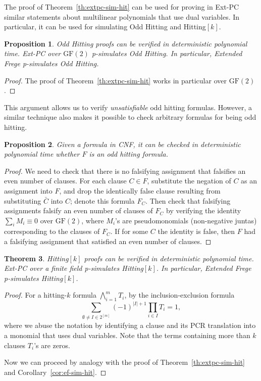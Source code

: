 \documentclass[11pt]{article}
\newcommand{\scterm}[1]{{\textrm{\sc #1}}}
\newcommand{\hit}{\scterm{Hitting}}
\newcommand{\F}{\scterm{Frege}}
\newcommand{\EF}{\scterm{Extended {\F}}}
\newcommand{\extpc}{\scterm{Ext-PC}}
\newcommand{\pcr}{\scterm{PCR}}
\newcommand{\hitodd}{\scterm{Odd} {\hit}}
\newcommand{\hitk}[1]{\hit$[#1]$}
\newcommand{\GF}{\mathrm{GF}}
\numberwithin{equation}{section}
\newtheorem{theorem}{Theorem}[section]
\newtheorem{proposition}[theorem]{Proposition}
\begin{document}
The proof of Theorem~\ref{th:extpc-sim-hit} can be used for
proving in {\extpc} similar statements about multilinear polynomials
that use dual variables. In particular, it can be used for 
simulating {\hitodd} and {\hitk{k}}. 

\begin{proposition}\label{prop:hitodd-verification}
{\hitodd} proofs can be verified in deterministic polynomial time.
{\extpc} over $\GF(2)$ p-simulates {\hitodd}.
In particular, {\EF} p-simulates {\hitodd}.
\end{proposition}
\begin{proof}The proof of Theorem~\ref{th:extpc-sim-hit} works in particular over $\GF(2)$.\end{proof}
This argument allows us to verify \emph{unsatisfiable} odd hitting formulas.
However, a similar technique also makes it possible to check arbitrary formulas
for being odd hitting.
\begin{proposition}\label{prop:hitodd-formula-verification}
Given a formula in CNF, it can be checked in deterministic polynomial time
whether $F$ is an odd hitting formula.
\end{proposition}
\begin{proof}
We need to check that there is no falsifying assignment that falsifies
an even number of clauses. For each clause $C\in F$, substitute
the negation of $C$ as an assignment into $F$, and drop the identically false
clause resulting from substituting $\bar{C}$ into $C$; denote this formula $F_C$. 
Then check that falsifying assignments falsify an even number of clauses of $F_C$
by verifying the identity $\sum_i M_i \equiv 0$ over $\GF(2)$, where $M_i$'s are pseudomonomials (non-negative juntas)
corresponding to the clauses of $F_C$. If for some $C$ the identity is false,
then $F$ had a falsifying assignment that satisfied an even number of clauses.
\end{proof}

\begin{theorem}\label{th:hitk-simulation}
{\hitk{k}} proofs can be verified in deterministic polynomial time.
{\extpc} over a finite field p-simulates {\hitk{k}}.
In particular, {\EF} p-simulates {\hitk{k}}.
\end{theorem}
\begin{proof}
For a hitting-$k$ formula $\bigwedge_{i=1}^m T_i$, by the inclusion-exclusion formula
\[
 \sum_{\emptyset \neq I \in 2^{[m]}} (-1)^{|I|+1} \prod_{i \in I} T_i = 1,
\]
where we abuse the notation by identifying a clause and its {\pcr} translation 
into a monomial that uses dual variables.
Note that the terms containing more than $k$ clauses $T_i$'s are zeros.

Now we can proceed by analogy with the proof of Theorem~\ref{th:extpc-sim-hit}
and Corollary~\ref{cor:ef-sim-hit}.
\end{proof}
\end{document}
